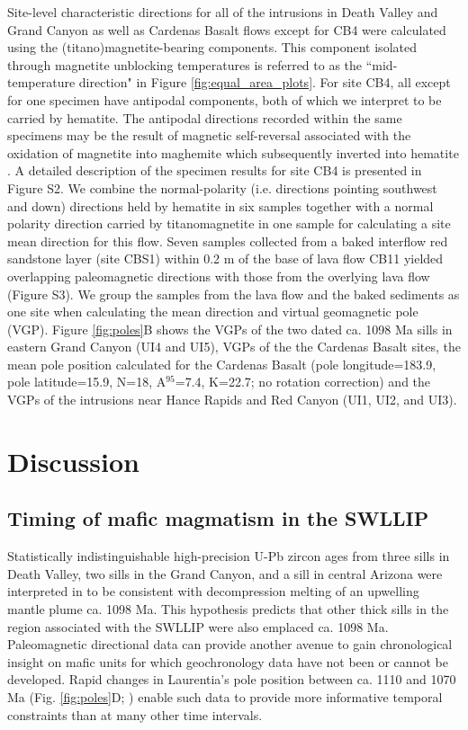 Site-level characteristic directions for all of the intrusions in Death Valley and Grand Canyon as well as Cardenas Basalt flows except for CB4 were calculated using the (titano)magnetite-bearing components. This component isolated through magnetite unblocking temperatures is referred to as the ``mid-temperature direction" in Figure \ref{fig:equal_area_plots}. For site CB4, all except for one specimen have antipodal components, both of which we interpret to be carried by hematite. The antipodal directions recorded within the same specimens may be the result of magnetic self-reversal associated with the oxidation of magnetite into maghemite which subsequently inverted into hematite \cite{Swanson-Hysell2011a}. A detailed description of the specimen results for site CB4 is presented in Figure S2. We combine the normal-polarity (i.e. directions pointing southwest and down) directions held by hematite in six samples together with a normal polarity direction carried by titanomagnetite in one sample for calculating a site mean direction for this flow. Seven samples collected from a baked interflow red sandstone layer (site CBS1) within 0.2 m of the base of lava flow CB11 yielded overlapping paleomagnetic directions with those from the overlying lava flow (Figure S3). We group the samples from the lava flow and the baked sediments as one site when calculating the mean direction and virtual geomagnetic pole (VGP). Figure \ref{fig:poles}B shows the VGPs of the two dated ca. 1098 Ma sills in eastern Grand Canyon (UI4 and UI5), VGPs of the the Cardenas Basalt sites, the mean pole position calculated for the Cardenas Basalt (pole longitude=183.9\textdegree, pole latitude=15.9\textdegree, N=18, A$^{95}$=7.4\textdegree, K=22.7; no rotation correction) and the VGPs of the intrusions near Hance Rapids and Red Canyon (UI1, UI2, and UI3). 

\section*{Discussion}

\subsection*{Timing of mafic magmatism in the SWLLIP}

Statistically indistinguishable high-precision U-Pb zircon ages from three sills in Death Valley, two sills in the Grand Canyon, and a sill in central Arizona were interpreted in  to be consistent with decompression melting of an upwelling mantle plume ca. 1098 Ma. This hypothesis predicts that other thick sills in the region associated with the SWLLIP were also emplaced ca. 1098 Ma. Paleomagnetic directional data can provide another avenue to gain chronological insight on mafic units for which geochronology data have not been or cannot be developed. Rapid changes in Laurentia's pole position between ca. 1110 and 1070 Ma (Fig. \ref{fig:poles}D; \cite{Swanson-Hysell2019a}) enable such data to provide more informative temporal constraints than at many other time intervals.

